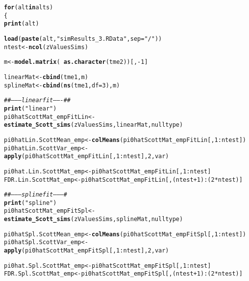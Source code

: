 \documentclass{article}\usepackage[]{graphicx}\usepackage[]{color}
\makeatletter
\newcommand{\hlnum}[1]{\textcolor[rgb]{0.686,0.059,0.569}{#1}}%
\newcommand{\hlstr}[1]{\textcolor[rgb]{0.192,0.494,0.8}{#1}}%
\newcommand{\hlcom}[1]{\textcolor[rgb]{0.678,0.584,0.686}{\textit{#1}}}%
\newcommand{\hlopt}[1]{\textcolor[rgb]{0,0,0}{#1}}%
\newcommand{\hlstd}[1]{\textcolor[rgb]{0.345,0.345,0.345}{#1}}%
\newcommand{\hlkwa}[1]{\textcolor[rgb]{0.161,0.373,0.58}{\textbf{#1}}}%
\newcommand{\hlkwb}[1]{\textcolor[rgb]{0.69,0.353,0.396}{#1}}%
\newcommand{\hlkwc}[1]{\textcolor[rgb]{0.333,0.667,0.333}{#1}}%
\newcommand{\hlkwd}[1]{\textcolor[rgb]{0.737,0.353,0.396}{\textbf{#1}}}%
\newenvironment{kframe}{%
 \def\at@end@of@kframe{}%
 \ifinner\ifhmode%
  \def\at@end@of@kframe{\end{minipage}}%
  \begin{minipage}{\columnwidth}%
 \fi\fi%
 \def\FrameCommand##1{\hskip\@totalleftmargin \hskip-\fboxsep
 \colorbox{shadecolor}{##1}\hskip-\fboxsep
     \hskip-\linewidth \hskip-\@totalleftmargin \hskip\columnwidth}%
 \MakeFramed {\advance\hsize-\width
   \@totalleftmargin\z@ \linewidth\hsize
   \@setminipage}}%
 {\par\unskip\endMakeFramed%
 \at@end@of@kframe}
\newenvironment{knitrout}{}{} %
\makeatother
\begin{document}
\begin{knitrout}
\color{fgcolor}\begin{kframe}
\begin{alltt}
\hlkwa{for}\hlstd{(alt} \hlkwa{in} \hlstd{alts)}
\hlstd{\{}
  \hlkwd{print}\hlstd{(alt)}

  \hlkwd{load}\hlstd{(}\hlkwd{paste}\hlstd{(alt,}\hlstr{"simResults_3.RData"}\hlstd{,}\hlkwc{sep}\hlstd{=}\hlstr{"/"}\hlstd{))}
  \hlstd{ntest} \hlkwb{<-} \hlkwd{ncol}\hlstd{(zValuesSims)}

  \hlstd{m} \hlkwb{<-} \hlkwd{model.matrix}\hlstd{(}\hlopt{~}\hlkwd{as.character}\hlstd{(tme2))[,}\hlopt{-}\hlnum{1}\hlstd{]}

  \hlstd{linearMat} \hlkwb{<-} \hlkwd{cbind}\hlstd{(tme1, m)}
  \hlstd{splineMat} \hlkwb{<-} \hlkwd{cbind}\hlstd{(}\hlkwd{ns}\hlstd{(tme1,}\hlkwc{df}\hlstd{=}\hlnum{3}\hlstd{), m)}

  \hlcom{##--------linear fit-------##}
  \hlkwd{print}\hlstd{(}\hlstr{"linear"}\hlstd{)}
  \hlstd{pi0hatScottMat_empFitLin} \hlkwb{<-} \hlkwd{estimate_Scott_sims}\hlstd{(zValuesSims, linearMat, nulltype)}

  \hlstd{pi0hatLin.ScottMean_emp} \hlkwb{<-} \hlkwd{colMeans}\hlstd{(pi0hatScottMat_empFitLin[,}\hlnum{1}\hlopt{:}\hlstd{ntest])}
  \hlstd{pi0hatLin.ScottVar_emp} \hlkwb{<-} \hlkwd{apply}\hlstd{(pi0hatScottMat_empFitLin[,}\hlnum{1}\hlopt{:}\hlstd{ntest],}\hlnum{2}\hlstd{,var)}

  \hlstd{pi0hat.Lin.ScottMat_emp} \hlkwb{<-} \hlstd{pi0hatScottMat_empFitLin[,}\hlnum{1}\hlopt{:}\hlstd{ntest]}
  \hlstd{FDR.Lin.ScottMat_emp} \hlkwb{<-} \hlstd{pi0hatScottMat_empFitLin[,(ntest}\hlopt{+}\hlnum{1}\hlstd{)}\hlopt{:}\hlstd{(}\hlnum{2}\hlopt{*}\hlstd{ntest)]}

  \hlcom{##---------spline fit---------#}
  \hlkwd{print}\hlstd{(}\hlstr{"spline"}\hlstd{)}
  \hlstd{pi0hatScottMat_empFitSpl} \hlkwb{<-} \hlkwd{estimate_Scott_sims}\hlstd{(zValuesSims, splineMat, nulltype)}

  \hlstd{pi0hatSpl.ScottMean_emp} \hlkwb{<-} \hlkwd{colMeans}\hlstd{(pi0hatScottMat_empFitSpl[,}\hlnum{1}\hlopt{:}\hlstd{ntest])}
  \hlstd{pi0hatSpl.ScottVar_emp} \hlkwb{<-} \hlkwd{apply}\hlstd{(pi0hatScottMat_empFitSpl[,}\hlnum{1}\hlopt{:}\hlstd{ntest],}\hlnum{2}\hlstd{,var)}

  \hlstd{pi0hat.Spl.ScottMat_emp} \hlkwb{<-} \hlstd{pi0hatScottMat_empFitSpl[,}\hlnum{1}\hlopt{:}\hlstd{ntest]}
  \hlstd{FDR.Spl.ScottMat_emp} \hlkwb{<-} \hlstd{pi0hatScottMat_empFitSpl[,(ntest}\hlopt{+}\hlnum{1}\hlstd{)}\hlopt{:}\hlstd{(}\hlnum{2}\hlopt{*}\hlstd{ntest)]}


\end{alltt}
\end{kframe}
\end{knitrout}
\end{document}
